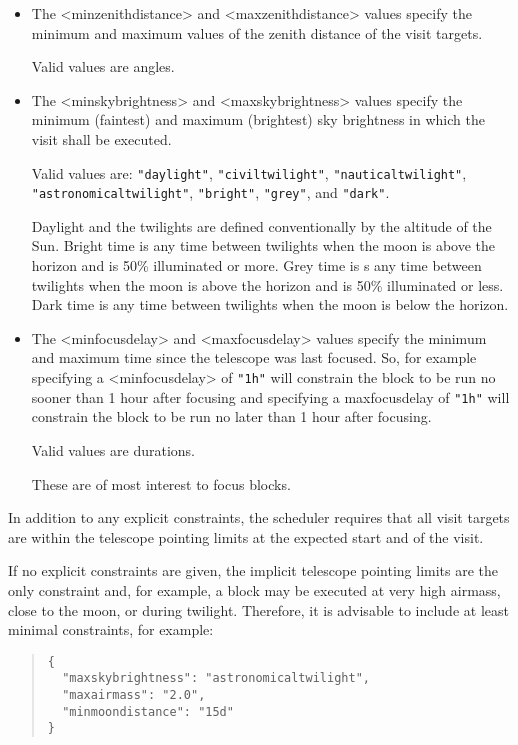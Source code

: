 \begin{itemize}
\item 
The <minzenithdistance> and <maxzenithdistance> values specify the minimum and maximum values of the zenith distance of the visit targets.

Valid values are angles.

\item The <minskybrightness> and <maxskybrightness> values specify the minimum (faintest) and maximum (brightest) sky brightness in which the visit shall be executed. 
    
Valid values are: \verb|"daylight"|, \verb|"civiltwilight"|, \verb|"nauticaltwilight"|, \verb|"astronomicaltwilight"|, \verb|"bright"|, \verb|"grey"|, and \verb|"dark"|. 
    
Daylight and the twilights are defined conventionally by the altitude of the Sun. Bright time is any time between twilights when the moon is above the horizon and is 50\% illuminated or more. Grey time is s any time between twilights when the moon is above the horizon and is 50\% illuminated or less. Dark time is any time between twilights when the moon is below the horizon.
    
\item
The <minfocusdelay> and <maxfocusdelay> values specify the minimum and maximum time since the telescope was last focused. So, for example specifying a <minfocusdelay> of \verb|"1h"| will constrain the block to be run no sooner than 1 hour after focusing and specifying a maxfocusdelay of \verb|"1h"| will constrain the block to be run no later than 1 hour after focusing.

Valid values are durations.

These are of most interest to focus blocks.

\end{itemize}

In addition to any explicit constraints, the scheduler requires that all visit targets are within the telescope pointing limits at the expected start and of the visit.

If no explicit constraints are given, the implicit telescope pointing limits are the only constraint and, for example, a block may be executed at very high airmass, close to the moon, or during twilight. Therefore, it is advisable to include at least minimal constraints, for example:
\begin{quote}
\begin{verbatim}
{
  "maxskybrightness": "astronomicaltwilight",
  "maxairmass": "2.0",
  "minmoondistance": "15d"
}
\end{verbatim}
\end{quote}

